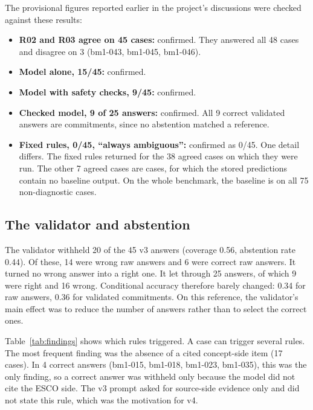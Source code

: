 The provisional figures reported earlier in the project's discussions were checked against these results:
\begin{itemize}
    \item \textbf{R02 and R03 agree on 45 cases:} confirmed. They answered all 48 cases and disagree on 3 (bm1-043, bm1-045, bm1-046).
    \item \textbf{Model alone, 15/45:} confirmed.
    \item \textbf{Model with safety checks, 9/45:} confirmed.
    \item \textbf{Checked model, 9 of 25 answers:} confirmed. All 9 correct validated answers are commitments, since no abstention matched a reference.
    \item \textbf{Fixed rules, 0/45, ``always ambiguous'':} confirmed as 0/45. One detail differs. The fixed rules returned \AM{} for the 38 agreed cases on which they were run. The other 7 agreed cases are  cases, for which the stored predictions contain no baseline output. On the whole benchmark, the baseline is \AM{} on all 75 non-diagnostic cases.
\end{itemize}

\subsection{The validator and abstention}

The validator withheld 20 of the 45 v3 answers (coverage 0.56, abstention rate 0.44). Of these, 14 were wrong raw answers and 6 were correct raw answers. It turned no wrong answer into a right one. It let through 25 answers, of which 9 were right and 16 wrong. Conditional accuracy therefore barely changed: 0.34 for raw answers, 0.36 for validated commitments. On this reference, the validator's main effect was to reduce the number of answers rather than to select the correct ones.

Table~\ref{tab:findings} shows which rules triggered. A case can trigger several rules. The most frequent finding was the absence of a cited concept-side item (17 cases). In 4 correct \SC{} answers (bm1-015, bm1-018, bm1-023, bm1-035), this was the only finding, so a correct answer was withheld only because the model did not cite the ESCO side. The v3 prompt asked for source-side evidence only and did not state this rule, which was the motivation for v4.

